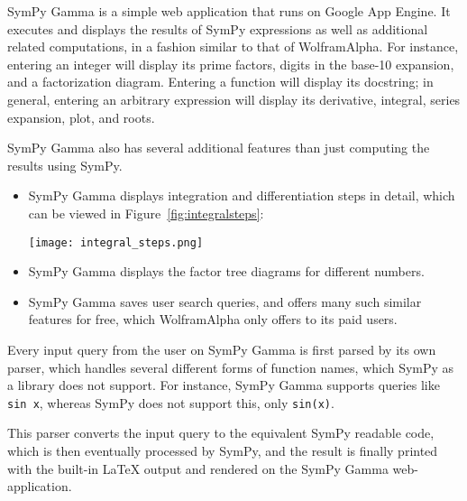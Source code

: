 
SymPy Gamma is a simple web application that runs on Google App Engine.
It executes and displays the results of SymPy expressions as well as
additional related computations, in a fashion similar to that of
Wolfram\textbar{}Alpha. For instance, entering an integer will display
its prime factors, digits in the base-10 expansion, and a factorization
diagram. Entering a function will display its docstring; in general,
entering an arbitrary expression will display its derivative, integral,
series expansion, plot, and roots.

SymPy Gamma also has several additional features than just computing the
results using SymPy.

\begin{itemize}
\item
  SymPy Gamma displays integration and differentiation steps in detail, which
  can be viewed in Figure~\ref{fig:integralsteps}:\par
  {
    \centering
    \texttt{[image: integral\_steps.png]}
    \label{fig:integralsteps}
    \par
  }
\item
  SymPy Gamma displays the factor tree diagrams for different numbers.
\item
  SymPy Gamma saves user search queries, and offers many such similar features
  for free, which Wolfram\textbar{}Alpha only offers to its paid users.
\end{itemize}
Every input query from the user on SymPy Gamma is first parsed by its
own parser, which handles several different forms of function names,
which SymPy as a library does not support. For instance, SymPy Gamma
supports queries like \texttt{sin\ x}, whereas SymPy does not support
this, only \verb|sin(x)|.

This parser converts the input query to the equivalent SymPy readable code,
which is then eventually processed by SymPy, and the result is finally printed
with the built-in LaTeX output and rendered on the SymPy Gamma web-application.
